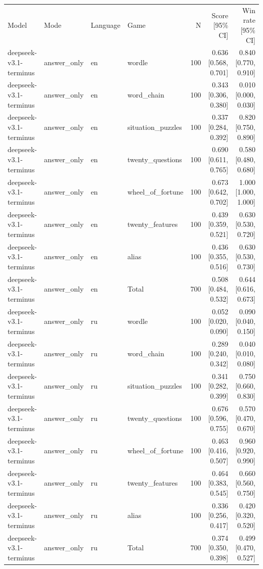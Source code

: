 \begin{longtable}{llllrrr}
Model & Mode & Language & Game & N & Score [95\% CI] & Win rate [95\% CI] \\
deepseek-v3.1-terminus & answer\_only & en & wordle & 100 & 0.636 [0.568, 0.701] & 0.840 [0.770, 0.910] \\
deepseek-v3.1-terminus & answer\_only & en & word\_chain & 100 & 0.343 [0.306, 0.380] & 0.010 [0.000, 0.030] \\
deepseek-v3.1-terminus & answer\_only & en & situation\_puzzles & 100 & 0.337 [0.284, 0.392] & 0.820 [0.750, 0.890] \\
deepseek-v3.1-terminus & answer\_only & en & twenty\_questions & 100 & 0.690 [0.611, 0.765] & 0.580 [0.480, 0.680] \\
deepseek-v3.1-terminus & answer\_only & en & wheel\_of\_fortune & 100 & 0.673 [0.642, 0.702] & 1.000 [1.000, 1.000] \\
deepseek-v3.1-terminus & answer\_only & en & twenty\_features & 100 & 0.439 [0.359, 0.521] & 0.630 [0.530, 0.720] \\
deepseek-v3.1-terminus & answer\_only & en & alias & 100 & 0.436 [0.355, 0.516] & 0.630 [0.530, 0.730] \\
deepseek-v3.1-terminus & answer\_only & en & Total & 700 & 0.508 [0.484, 0.532] & 0.644 [0.616, 0.673] \\
deepseek-v3.1-terminus & answer\_only & ru & wordle & 100 & 0.052 [0.020, 0.090] & 0.090 [0.040, 0.150] \\
deepseek-v3.1-terminus & answer\_only & ru & word\_chain & 100 & 0.289 [0.240, 0.342] & 0.040 [0.010, 0.080] \\
deepseek-v3.1-terminus & answer\_only & ru & situation\_puzzles & 100 & 0.341 [0.282, 0.399] & 0.750 [0.660, 0.830] \\
deepseek-v3.1-terminus & answer\_only & ru & twenty\_questions & 100 & 0.676 [0.596, 0.755] & 0.570 [0.470, 0.670] \\
deepseek-v3.1-terminus & answer\_only & ru & wheel\_of\_fortune & 100 & 0.463 [0.416, 0.507] & 0.960 [0.920, 0.990] \\
deepseek-v3.1-terminus & answer\_only & ru & twenty\_features & 100 & 0.464 [0.383, 0.545] & 0.660 [0.560, 0.750] \\
deepseek-v3.1-terminus & answer\_only & ru & alias & 100 & 0.336 [0.256, 0.417] & 0.420 [0.320, 0.520] \\
deepseek-v3.1-terminus & answer\_only & ru & Total & 700 & 0.374 [0.350, 0.398] & 0.499 [0.470, 0.527] \\

\end{longtable}
